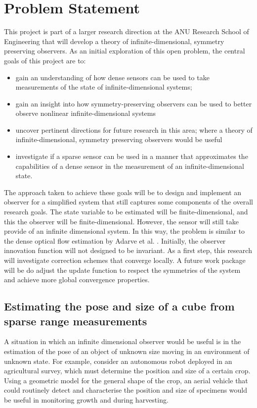 \chapter{Problem Statement}
This project is part of a larger research direction at the ANU Research School of Engineering that will develop a theory of infinite-dimensional, symmetry preserving observers.
As an initial exploration of this open problem, the central goals of this project are to:
\begin{itemize}
\item gain an understanding of how dense sensors can be used to take measurements of the state of infinite-dimensional systems;
\item gain an insight into how symmetry-preserving observers can be used to better observe nonlinear infinite-dimensional systems
\item uncover pertinent directions for future research in this area; where a theory of infinite-dimensional, symmetry preserving observers would be useful
\item investigate if a sparse sensor can be used in a manner that approximates the capabilities of a dense sensor in the measurement of an infinite-dimensional state.
\end{itemize}

The approach taken to achieve these goals will be to design and implement an observer for a simplified system that still captures some components of the overall research goals.
The state variable to  be estimated will be finite-dimensional, and this the observer will be finite-dimensional. However, the sensor will still take provide of an infinite dimensional system. In this way, the problem is similar to the dense optical flow estimation by Adarve et al. \cite{adarvefiltering}.
Initially, the observer innovation function will not designed to be invariant. As a first step, this research will investigate correction schemes that converge locally. A future work package will be do adjust the update function to respect the symmetries of the system and achieve more global convergence properties. 

\section{Estimating the pose and size of a cube from sparse range measurements}

A situation in which an infinite dimensional observer would be useful is in the estimation of the pose of an object of unknown size moving in an environment of unknown state.
For example, consider an autonomous robot deployed in an agricultural survey, which must determine the position and size of a certain crop. Using a geometric model for the general shape of the crop, an aerial vehicle that could routinely detect and characterise the position and size of specimens would be useful in monitoring growth and during harvesting.

